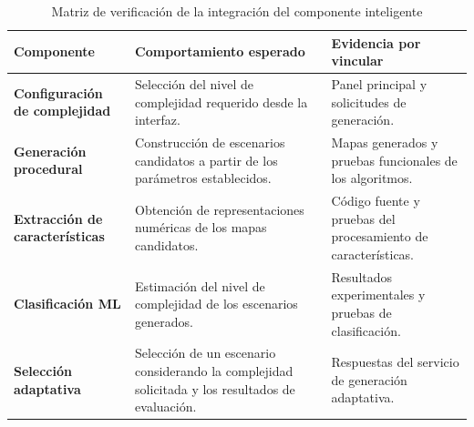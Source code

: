 \begin{table}[htbp]
    \centering

    \caption{Matriz de verificación de la integración del componente inteligente}
    \label{tab:resultados_integracion_ia}

    \renewcommand{\arraystretch}{1.2}

    \begin{tabularx}{\textwidth}{
        |>{\raggedright\arraybackslash}p{3cm}|
         >{\raggedright\arraybackslash}X|
         >{\raggedright\arraybackslash}X|
    }
        \hline

        \rowcolor{gray!15}
        \textbf{Componente} &
        \textbf{Comportamiento esperado} &
        \textbf{Evidencia por vincular} \\

        \hline

        \textbf{Configuración de complejidad} &
        Selección del nivel de complejidad requerido
        desde la interfaz. &
        Panel principal y solicitudes de generación. \\

        \hline

        \textbf{Generación procedural} &
        Construcción de escenarios candidatos a
        partir de los parámetros establecidos. &
        Mapas generados y pruebas funcionales
        de los algoritmos. \\

        \hline

        \textbf{Extracción de características} &
        Obtención de representaciones numéricas
        de los mapas candidatos. &
        Código fuente y pruebas del procesamiento
        de características. \\

        \hline

        \textbf{Clasificación ML} &
        Estimación del nivel de complejidad de
        los escenarios generados. &
        Resultados experimentales y pruebas de
        clasificación. \\

        \hline

        \textbf{Selección adaptativa} &
        Selección de un escenario considerando
        la complejidad solicitada y los resultados
        de evaluación. &
        Respuestas del servicio de generación
        adaptativa. \\

        \hline


\end{tabularx}
\end{table}
